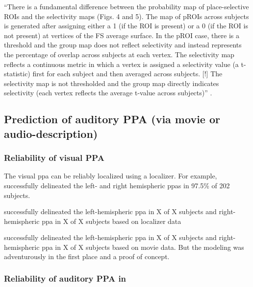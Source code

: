 %
``There is a fundamental difference between the probability map of
place-selective ROIs and the selectivity maps (Figs. 4 and 5).
%
The map of pROIs across subjects is generated after assigning either a 1 (if the
ROI is present) or a 0 (if the ROI is not present) at vertices of the FS average
surface.
%
In the pROI case, there is a threshold and the group map does not reflect
selectivity and instead represents the percentage of overlap across subjects at
each vertex.
%
The selectivity map reflects a continuous metric in which a vertex is assigned a
selectivity value (a t-statistic) first for each subject and then averaged
across subjects.
%
[!] The selectivity map is not thresholded and the group map directly indicates
selectivity (each vertex reflects the average t-value across subjects)''
\citep{weiner2018defining}.



\subsection{Prediction of auditory PPA (via movie or audio-description)}


\subsubsection{Reliability of visual PPA}

The visual \ac{ppa} can be reliably localized using a localizer.
%
For example, \citet{zhen2017quantifying} successfully delineated the left- and
right hemispheric \acp{ppa} in 97.5\% of 202 subjects.

\citet{sengupta2016extension} successfully delineated the left-hemispheric
\ac{ppa} in X of X subjects and right-hemispheric \ac{ppa} in X of X subjects
based on localizer data

\citet{haeusler2022processing} successfully delineated the left-hemispheric
\ac{ppa} in X of X subjects and right-hemispheric \ac{ppa} in X of X subjects
based on movie data.
%
But the modeling was adventurously in the first place and a proof of concept.


\subsubsection{Reliability of auditory PPA in \citet{haeusler2022processing}}



